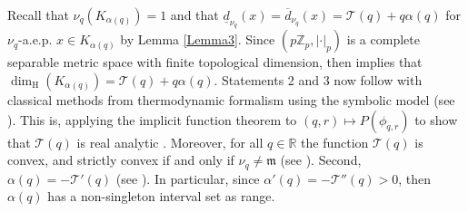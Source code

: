 \documentclass[11pt]{amsart}
\theoremstyle{remark}
\numberwithin{equation}{section}
\newcommand{\R}{\mathbb{R}}
\newcommand{\Zp}{\mathbb{Z}_p}
\begin{document}
Recall that $\nu_{q}(K_{\alpha(q)})=1$ and that $\underline{d}_{\nu_{q}}(x)=\overline{d}_{\nu_{q}}(x)=\mathcal{T}(q)+q\alpha(q)$  for $\nu_{q}$-a.e.p. $x\in K_{\alpha(q)}$ by Lemma \ref{Lemma3}. Since $(p\Zp,|\cdot|_{p})$ is a complete separable metric space with finite topological dimension, then \cite[Proposition 3]{yh} implies that $\dim_{\mathrm{H}}(K_{\alpha(q)})=\mathcal{T}(q)+q\alpha(q)$. Statements 2 and 3 now follow with classical methods from thermodynamic formalism using the symbolic model (see \cite{yh,sa2}). This is, applying the implicit function theorem to $(q,r)\mapsto P( \phi_{q,r})$ to show that $\mathcal{T}(q)$ is real analytic \cite[Lemma 3]{yh}. Moreover, for all $q\in \R$  the function $\mathcal{T}(q)$ is convex, and strictly convex if and only if $\nu_{q}\neq \mathfrak{m}$ (see \cite[Lemma 5]{yh}). Second, $\alpha(q)=-\mathcal{T}'(q)$ (see \cite[Lemma 4]{yh}).  In particular, since $\alpha'(q)=-\mathcal{T}''(q)>0$, then $\alpha(q)$ has a non-singleton interval set as range. 
\end{document}
